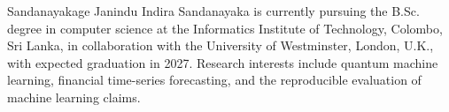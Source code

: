 \documentclass{ieeeaccess}
\begin{document}
\begin{IEEEbiographynophoto}{Sandanayakage Janindu Indira Sandanayaka}
is currently pursuing the B.Sc. degree in computer science at the Informatics Institute of Technology, Colombo, Sri Lanka, in collaboration with the University of Westminster, London, U.K., with expected graduation in 2027. Research interests include quantum machine learning, financial time-series forecasting, and the reproducible evaluation of machine learning claims.
\end{IEEEbiographynophoto}


\EOD
\end{document}
